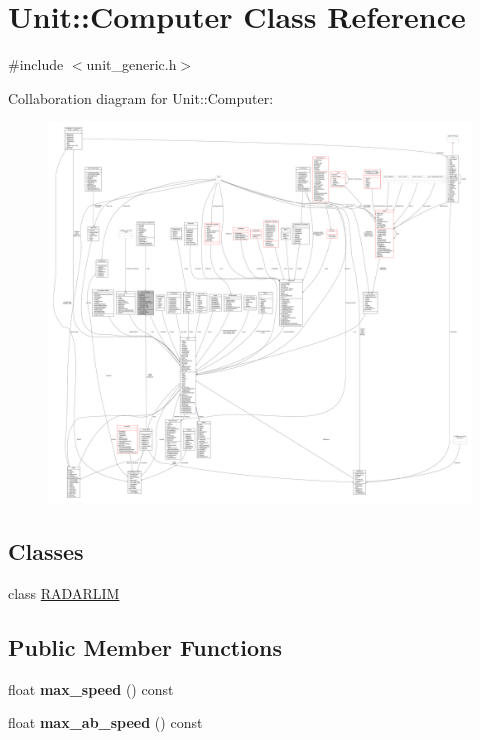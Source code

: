 \hypertarget{classUnit_1_1Computer}{}\section{Unit\+:\+:Computer Class Reference}
\label{classUnit_1_1Computer}


{\ttfamily \#include $<$unit\+\_\+generic.\+h$>$}



Collaboration diagram for Unit\+:\+:Computer\+:
\nopagebreak
\begin{figure}[H]
\begin{center}
\leavevmode
\includegraphics[width=350pt]{de/d76/classUnit_1_1Computer__coll__graph}
\end{center}
\end{figure}
\subsection*{Classes}
\begin{DoxyCompactItemize}
\item 
class \hyperlink{classUnit_1_1Computer_1_1RADARLIM}{R\+A\+D\+A\+R\+L\+IM}
\end{DoxyCompactItemize}
\subsection*{Public Member Functions}
\begin{DoxyCompactItemize}
\item 
float {\bfseries max\+\_\+speed} () const \hypertarget{classUnit_1_1Computer_ac9906eaab7099f30d86723938b528358}{}\label{classUnit_1_1Computer_ac9906eaab7099f30d86723938b528358}

\item 
float {\bfseries max\+\_\+ab\+\_\+speed} () const \hypertarget{classUnit_1_1Computer_a0dcd93d2506fd8f199508209ca95644e}{}\label{classUnit_1_1Computer_a0dcd93d2506fd8f199508209ca95644e}

\end{DoxyCompactItemize}
